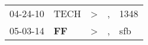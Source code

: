 \begin{supertabular}{p{0.07\textwidth}p{0.06\textwidth}p{0.02\textwidth}p{0.02\textwidth}p{0.06\textwidth}}
 04-24-10\textsuperscript{} &         TECH\textsuperscript{} &  \textgreater &  , &  1348\textsuperscript{} \\
 05-03-14\textsuperscript{} &  \textbf{FF\textsuperscript{}} &  \textgreater &  , &   sfb\textsuperscript{} \\
\end{supertabular}
